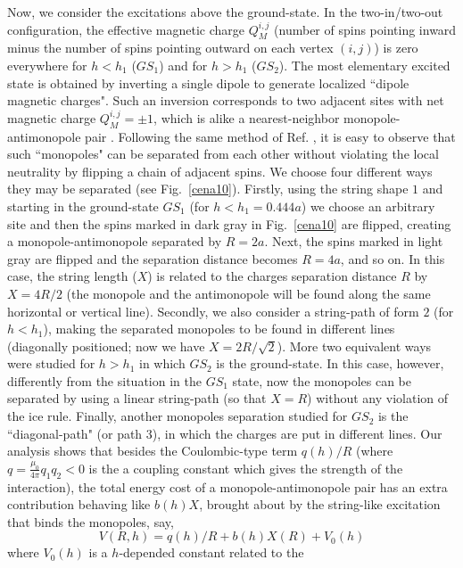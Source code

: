 \documentclass[aps,prb,twocolumn,floatfix,showpacs,amsmath,amssymb]{revtex4}
\begin{document}
Now, we consider the excitations above the ground-state. In the
two-in/two-out configuration, the effective magnetic charge
$Q_{M}^{i,j}$ (number of spins pointing inward minus the number of
spins pointing outward on each vertex $(i,j)$) is zero everywhere
for $h<h_1$ ($GS_1$) and for $h>h_1$ ($GS_2$). The most elementary
excited state is obtained by inverting a single dipole to generate
localized ``dipole magnetic charges". Such an inversion
corresponds to two adjacent sites with net magnetic charge
$Q_{M}^{i,j}=\pm 1$, which is alike a nearest-neighbor
monopole-antimonopole pair \cite{Castelnovo08,Mol09}. Following
the same method of Ref. , it is easy to observe
that such ``monopoles" can be separated from each other without
violating the local neutrality by flipping a chain of adjacent
spins. We choose four different ways they may be separated (see Fig.\ \ref{cena10}). Firstly,
using the string shape $1$ and starting in the ground-state
$GS_{1}$ (for $h<h_1=0.444a$) we choose an arbitrary site and then
the spins marked in dark gray in Fig.\ \ref{cena10} are flipped,
creating a monopole-antimonopole separated by $R=2a$. Next, the
spins marked in light gray are flipped and the separation distance
becomes $R=4a$, and so on. In this case, the string length ($X$)
is related to the charges separation distance $R$ by $X=4R/2$ (the
monopole and the antimonopole will be found along the same
horizontal or vertical line). Secondly, we also consider a
string-path of form $2$ (for $h<h_1$), making the separated
monopoles to be found in different lines (diagonally positioned;
now we have $X=2R/\sqrt{2}$). More two equivalent ways
were studied for $h>h_1$ in which $GS_2$ is the
ground-state. In this case, however, differently from the
situation in the $GS_{1}$ state, now the monopoles can be
separated by using a linear string-path (so that $X=R$) without
any violation of the ice rule. Finally, another monopoles
separation studied for $GS_{2}$ is the ``diagonal-path" (or path
3), in which the charges are put in different lines. Our analysis
shows that besides the Coulombic-type term $q(h)/R$ (where
$q=\frac{\mu_0}{4\pi}q_1q_2<0$ is the a coupling constant which
gives the strength of the interaction), the total energy cost of a
monopole-antimonopole pair has an extra contribution behaving like
$b(h)X$, brought about by the string-like excitation that binds
the monopoles, say,
\begin{equation}
V(R,h)=q(h)/R+b(h)X(R)+V_{0}(h)
\label{potential}
\end{equation}
where $V_{0}(h)$ is a $h$-depended constant related to the
\end{document}
